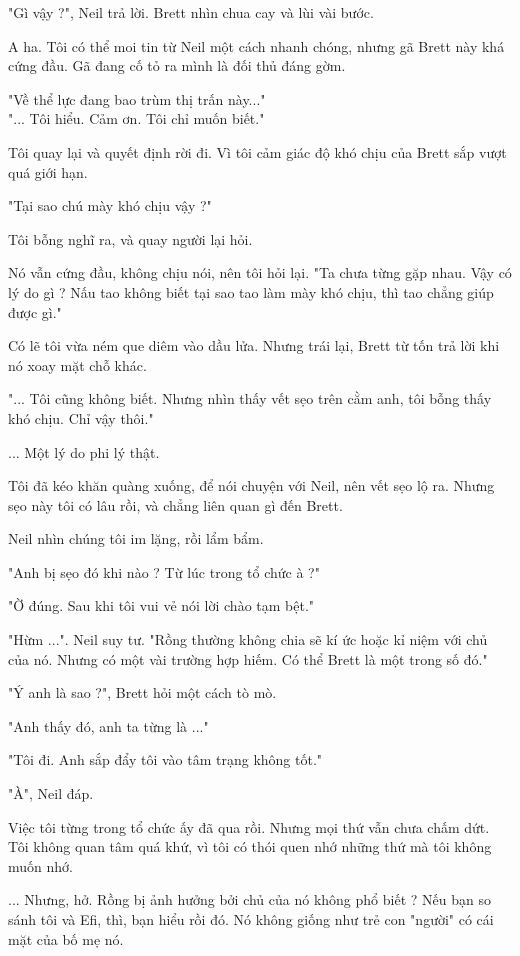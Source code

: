 "Gì vậy ?", Neil trả lời. Brett nhìn chua cay và lùi vài bước.

A ha. Tôi có thể moi tin từ Neil một cách nhanh chóng, nhưng gã Brett này khá cứng đầu. Gã đang cố tỏ ra mình là đối thủ đáng gờm.

"Về thể lực đang bao trùm thị trấn này..." \\


"... Tôi hiểu. Cảm ơn. Tôi chỉ muốn biết."

Tôi quay lại và quyết định rời đi. Vì tôi cảm giác độ khó chịu của Brett sắp vượt quá giới hạn.

"Tại sao chú mày khó chịu vậy ?"

Tôi bỗng nghĩ ra, và quay người lại hỏi.

Nó vẫn cứng đầu, không chịu nói, nên tôi hỏi lại. "Ta chưa từng gặp nhau. Vậy có lý do gì ? Nấu tao không biết tại sao tao làm mày khó chịu, thì tao chẳng giúp được gì."

Có lẽ tôi vừa ném que diêm vào dầu lửa. Nhưng trái lại, Brett từ tốn trả lời khi nó xoay mặt chỗ khác.

"... Tôi cũng không biết. Nhưng nhìn thấy vết sẹo trên cằm anh, tôi bỗng thấy khó chịu. Chỉ vậy thôi."

... Một lý do phi lý thật.

Tôi đã kéo khăn quàng xuống, để nói chuyện với Neil, nên vết sẹo lộ ra. Nhưng sẹo này tôi có lâu rồi, và chẳng liên quan gì đến Brett.

Neil nhìn chúng tôi im lặng, rồi lẩm bẩm.

"Anh bị sẹo đó khi nào ? Từ lúc trong tổ chức à ?"

"Ờ đúng. Sau khi tôi vui vẻ nói lời chào tạm bệt."

"Hừm ...". Neil suy tư. "Rồng thường không chia sẽ kí ức hoặc kỉ niệm với chủ của nó. Nhưng có một vài trường hợp hiếm. Có thể Brett là một trong số đó."

"Ý anh là sao ?", Brett hỏi một cách tò mò.

"Anh thấy đó, anh ta từng là ..."

"Tôi đi. Anh sắp đẩy tôi vào tâm trạng không tốt."

"À", Neil đáp.

Việc tôi từng trong tổ chức ấy đã qua rồi. Nhưng mọi thứ vẫn chưa chấm dứt. Tôi không quan tâm quá khứ, vì tôi có thói quen nhớ những thứ mà tôi không muốn nhớ.

... Nhưng, hở. Rồng bị ảnh hưởng bởi chủ của nó không phổ biết ? Nếu bạn so sánh tôi và Efi, thì, bạn hiểu rồi đó. Nó không giống như trẻ con "người" có cái mặt của bố mẹ nó.

